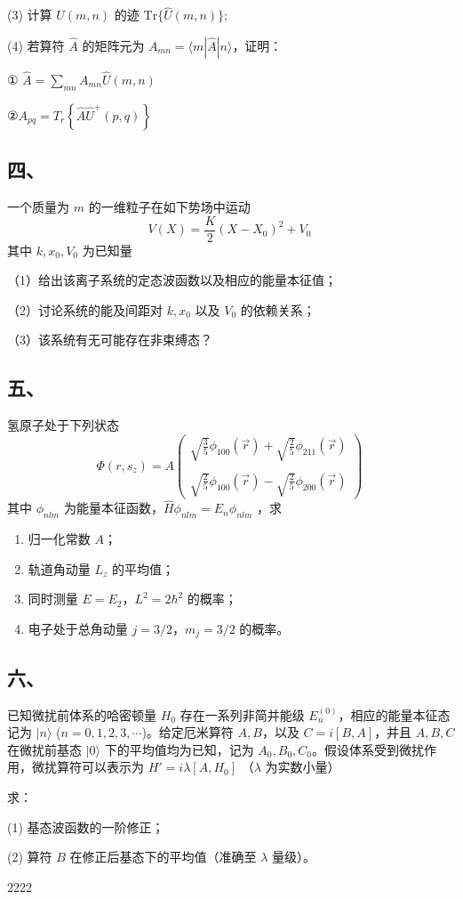 (3) 计算 $\hat{U}(m,n)$ 的迹 $\mathrm{Tr}\{\hat{U}(m,n)\}$;

(4) 若算符 $\hat{A}$ 的矩阵元为 $A_{mn} = \langle m|\hat{A}|n\rangle$，证明：

① $\hat{A} =\sum_{mn} A_{mn} \hat{U}(m,n)$

②$A_{pq} =T_r\left\{\hat{A}\hat{U}^+(p,q)\right\}$
\subsection{四、}
一个质量为 $m$ 的一维粒子在如下势场中运动
$$V(X)=\frac{K}{2}(X-X_0)^2+V_0~$$
其中 $k, x_0, V_0$ 为已知量

（1）给出该离子系统的定态波函数以及相应的能量本征值；

（2）讨论系统的能及间距对 $k,x_0$ 以及 $V_0$ 的依赖关系；

（3）该系统有无可能存在非束缚态？
\subsection{五、}
氢原子处于下列状态
$$\Phi(r, s_z) = A \begin{pmatrix}
\sqrt{\frac{3}{5}} \phi_{100}(\vec{r}) + \sqrt{\frac{2}{5}} \phi_{211}(\vec{r}) \\\\
\sqrt{\frac{2}{5}} \phi_{100}(\vec{r}) - \sqrt{\frac{2}{5}} \phi_{200}(\vec{r})
\end{pmatrix}~
$$
其中 $\phi_{nlm}$ 为能量本征函数，$\hat{H} \phi_{nlm} = E_n \phi_{nlm}$ ，求

\begin{enumerate}
  \item 归一化常数 $A$；
  \item 轨道角动量 $L_z$ 的平均值；
  \item 同时测量 $E = E_2$，$L^2 = 2\hbar^2$ 的概率；
  \item 电子处于总角动量 $j = 3/2$，$m_j = 3/2$ 的概率。
\end{enumerate}
\subsection{六、}
已知微扰前体系的哈密顿量 $H_0$ 存在一系列非简并能级 $E_n^{(0)}$，相应的能量本征态记为 $|n\rangle$ ($n = 0, 1, 2, 3, \cdots$)。给定厄米算符 $A, B$，以及 $C = i[B, A]$，并且 $A, B, C$ 在微扰前基态 $|0\rangle$ 下的平均值均为已知，记为 $A_0, B_0, C_0$。假设体系受到微扰作用，微扰算符可以表示为 $H' = i\lambda[A, H_0]$ （$\lambda$ 为实数小量）

求：

(1) 基态波函数的一阶修正；

(2) 算符 $B$ 在修正后基态下的平均值（准确至 $\lambda$ 量级）。

\begin{example}{2222}

\end{example}